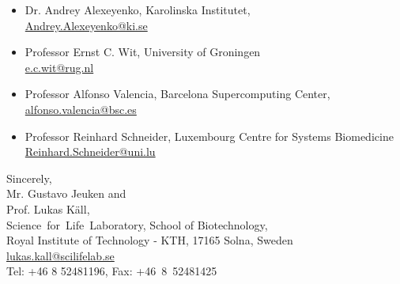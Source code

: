 \documentclass[a4paper]{letter}
\begin{document}
\begin{letter}{}
\begin{itemize}
\item Dr. Andrey Alexeyenko, Karolinska Institutet, \\
\url{Andrey.Alexeyenko@ki.se}

\item Professor Ernst C. Wit, University of Groningen\\
\url{e.c.wit@rug.nl}

\item Professor Alfonso Valencia, Barcelona Supercomputing Center,\\
\url{alfonso.valencia@bsc.es}

\item Professor Reinhard Schneider,  Luxembourg Centre for Systems Biomedicine \\
\url{Reinhard.Schneider@uni.lu}

\end{itemize}

\vspace*{1.5em}

Sincerely,\\[2em]
Mr. Gustavo Jeuken and\\
Prof. Lukas K\"all, \\
Science~for~Life~Laboratory, School of Biotechnology,\\
Royal Institute of Technology - KTH, 17165 Solna, Sweden\\
\url{lukas.kall@scilifelab.se}\\
Tel: +46 8 52481196, Fax: +46~8~52481425

\end{letter}
\end{document}
